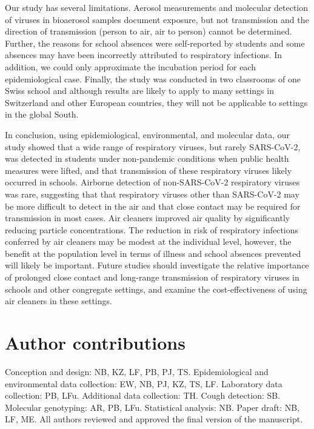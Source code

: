 \documentclass[fleqn,11pt]{wlscirep}
\begin{document}

Our study has several limitations. Aerosol measurements and molecular detection of viruses in bioaerosol samples document exposure, but not transmission and the direction of transmission (person to air, air to person) cannot be determined. Further, the reasons for school absences were self-reported by students and some absences may have been incorrectly attributed to respiratory infections. In addition, we could only approximate the incubation period for each epidemiological case. Finally, the study was conducted in two classrooms of one Swiss school and although results are likely to apply to many settings in Switzerland and other European countries, they will not be applicable to settings in the global South. 


In conclusion, using epidemiological, environmental, and molecular data, our study showed that a wide range of respiratory viruses, but rarely SARS-CoV-2, was detected in students under non-pandemic conditions when public health measures were lifted, and that transmission of these respiratory viruses likely occurred in schools. Airborne detection of non-SARS-CoV-2 respiratory viruses was rare, suggesting that that respiratory viruses other than SARS-CoV-2 may be more difficult to detect in the air and that close contact may be required for transmission in most cases. Air cleaners improved air quality by significantly reducing particle concentrations. The reduction in risk of respiratory infections conferred by air cleaners may be modest at the individual level, however, the benefit at the population level in terms of illness and school absences prevented will likely be important. Future studies should investigate the relative importance of prolonged close contact and long-range transmission of respiratory viruses in schools and other congregate settings, and examine the cost-effectiveness of using air cleaners in these settings.

\newpage


\section*{Author contributions}
Conception and design: NB, KZ, LF, PB, PJ, TS. Epidemiological and environmental data collection: EW, NB, PJ, KZ, TS, LF. Laboratory data collection: PB, LFu. Additional data collection: TH. Cough detection: SB. Molecular genotyping: AR, PB, LFu. Statistical analysis: NB. Paper draft: NB, LF, ME. All authors reviewed and approved the final version of the manuscript.
\end{document}
